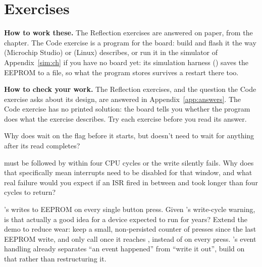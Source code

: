 
\section{Exercises}
\label{c7:sec:exercises}\label{c7:app:b}

\begin{aside}
\textbf{How to work these.} The Reflection exercises are answered on paper, from the chapter. The
Code exercise is a program for the board: build and flash it the way  (Microchip
Studio) or  (Linux) describes, or run it in the simulator of
Appendix~\ref{sim:ch} if you have no board yet: its simulation harness ()
saves the EEPROM to a file, so what the program stores survives a restart there too.

\textbf{How to check your work.} The Reflection exercises, and the question the Code exercise asks
about its design, are answered in Appendix~\ref{app:answers}. The Code exercise has no printed
solution: the board tells you whether the program does what the exercise describes. Try each
exercise before you read its answer.
\end{aside}

\label{c7:set:1}

\label{c7:ex:1}
{\raggedright
Why does  wait on the  flag before it starts, but
 doesn't need to wait for anything after its read completes?\par}

\label{c7:ex:2}
 must be followed by  within four CPU cycles or the write silently fails.
Why does that specifically mean interrupts need to be disabled for that window, and what real
failure would you expect if an ISR fired in between and took longer than four cycles to return?

\label{c7:set:2}

\label{c7:ex:3}
's  writes to EEPROM on every single button press. Given
's write-cycle warning, is that actually a good idea for a device expected to run for
years? Extend the demo to reduce wear: keep a small, non-persisted counter of presses since the
last EEPROM write, and only call  once it reaches , instead of on every
press. 's event handling already separates ``an event happened'' from ``write it
out'', build on that rather than restructuring it.
